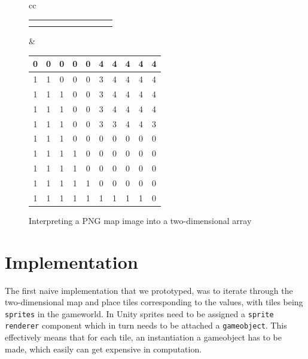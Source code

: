 \begin{figure}[H]
\begin{tabular}{cc}
{\begin{tabular}{|c|c|c|c|c|c|c|c|c|c|}
                \cellcolor{black} & \cellcolor{black} & \cellcolor{black} &
                \cellcolor{black} \\ \hline
                \cellcolor{green} & \cellcolor{green} & \cellcolor{green} &
                \cellcolor{green} & \cellcolor{green} & \cellcolor{black} &
                \cellcolor{black} & \cellcolor{black} & \cellcolor{black} &
                \cellcolor{black} \\ \hline
                \cellcolor{green} & \cellcolor{green} & \cellcolor{green} &
                \cellcolor{green} & \cellcolor{green} & \cellcolor{green} &
                \cellcolor{green} & \cellcolor{green} & \cellcolor{green} &
                \cellcolor{black} \\ \hline
            \end{tabular}
        }
        &
        {\footnotesize
            \setlength{\tabcolsep}{2.5pt}
            \begin{tabular}{|c|c|c|c|c|c|c|c|c|c|}
                \hline
                0 & 0 & 0 & 0 & 0 & 4 & 4 & 4 & 4 & 4 \\ \hline
                1 & 1 & 0 & 0 & 0 & 3 & 4 & 4 & 4 & 4 \\ \hline
                1 & 1 & 1 & 0 & 0 & 3 & 4 & 4 & 4 & 4 \\ \hline
                1 & 1 & 1 & 0 & 0 & 3 & 4 & 4 & 4 & 4 \\ \hline
                1 & 1 & 1 & 0 & 0 & 3 & 3 & 4 & 4 & 3 \\ \hline
                1 & 1 & 1 & 0 & 0 & 0 & 0 & 0 & 0 & 0 \\ \hline
                1 & 1 & 1 & 1 & 0 & 0 & 0 & 0 & 0 & 0 \\ \hline
                1 & 1 & 1 & 1 & 0 & 0 & 0 & 0 & 0 & 0 \\ \hline
                1 & 1 & 1 & 1 & 1 & 0 & 0 & 0 & 0 & 0 \\ \hline
                1 & 1 & 1 & 1 & 1 & 1 & 1 & 1 & 1 & 0 \\ \hline
            \end{tabular}
        }
    \end{tabular}
    \caption{Interpreting a PNG map image into a two-dimensional array}\label{fig:png_to_array} 
\end{figure}

\section{Implementation}
The first naive implementation that we prototyped, was to iterate through the two-dimensional map and place tiles corresponding to the values, with tiles being \texttt{sprites} in the gameworld.
In Unity sprites need to be assigned a \texttt{sprite renderer} component which in turn needs to be attached a \texttt{gameobject}.
This effectively means that for each tile, an instantiation a gameobject has to be made, which easily can get expensive in computation.

